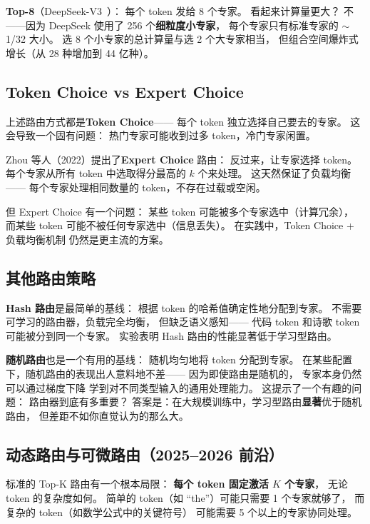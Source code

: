 \textbf{Top-8}（DeepSeek-V3~\cite{deepseekv3}）：
每个 token 发给 8 个专家。
看起来计算量更大？
不——因为 DeepSeek 使用了 256 个\textbf{细粒度小专家}，
每个专家只有标准专家的 $\sim$1/32 大小。
选 8 个小专家的总计算量与选 2 个大专家相当，
但组合空间爆炸式增长（从 28 种增加到 44 亿种）。

\subsection{Token Choice vs Expert Choice}

上述路由方式都是\textbf{Token Choice}——
每个 token 独立选择自己要去的专家。
这会导致一个固有问题：
热门专家可能收到过多 token，冷门专家闲置。

Zhou 等人（2022）提出了\textbf{Expert Choice} 路由：%
反过来，让专家选择 token。
每个专家从所有 token 中选取得分最高的 $k$ 个来处理。
这天然保证了负载均衡——
每个专家处理相同数量的 token，不存在过载或空闲。

但 Expert Choice 有一个问题：
某些 token 可能被多个专家选中（计算冗余），
而某些 token 可能不被任何专家选中（信息丢失）。
在实践中，Token Choice + 负载均衡机制
仍然是更主流的方案。

\subsection{其他路由策略}

\textbf{Hash 路由}是最简单的基线：
根据 token 的哈希值确定性地分配到专家。
不需要可学习的路由器，负载完全均衡，
但缺乏语义感知——
代码 token 和诗歌 token 可能被分到同一个专家。
实验表明 Hash 路由的性能显著低于学习型路由。

\textbf{随机路由}也是一个有用的基线：
随机均匀地将 token 分配到专家。
在某些配置下，随机路由的表现出人意料地不差——
因为即使路由是随机的，
专家本身仍然可以通过梯度下降
学到对不同类型输入的通用处理能力。
这提示了一个有趣的问题：
路由器到底有多重要？
答案是：在大规模训练中，学习型路由\textbf{显著}优于随机路由，
但差距不如你直觉认为的那么大。

\subsection{动态路由与可微路由（2025--2026 前沿）}
\label{sec:advanced-routing}

标准的 Top-K 路由有一个根本局限：
\textbf{每个 token 固定激活 $K$ 个专家}，
无论 token 的复杂度如何。
简单的 token（如 ``the''）可能只需要 1 个专家就够了，
而复杂的 token（如数学公式中的关键符号）
可能需要 5 个以上的专家协同处理。


